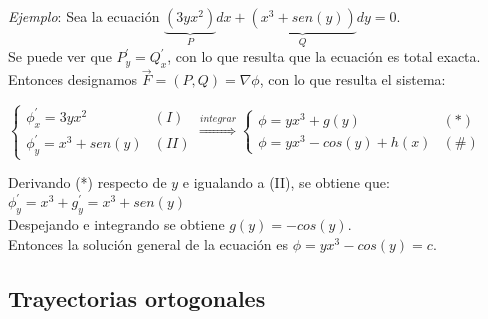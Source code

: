 \documentclass[twoside]{article}
\numberwithin{equation}{section}
\numberwithin{figure}{section}
\numberwithin{table}{section}
\begin{document}
			\vspace{1.5cm}
			
				\emph{Ejemplo}: Sea la ecuación $\underbrace{(3yx^2)}_{P}dx+\underbrace{(x^3+sen(y))}_{Q}dy=0$.\\
				
				Se puede ver que $P^\prime_{y}=Q^\prime_{x}$, con lo que resulta que la ecuación es total exacta.\\
				
				Entonces designamos $\vec{F}=(P,Q)=\nabla\phi$, con lo que resulta el sistema:
								
				\begin{center}
					$\begin{cases}
					\phi^\prime_{x}=3yx^2 & (I)\\
					\phi^\prime_{y}=x^3+sen(y) & (II)\end{cases}\overset{integrar}{\Rightarrow}\begin{cases}
					\phi=yx^3+g(y) & (*)\\
					\phi=yx^3-cos(y)+h(x) & (\#)\end{cases}$
				\end{center}
				
			Derivando ({*}) respecto de $y$ e igualando a (II), se obtiene que:$\phi^\prime_{y}=x^3+g^\prime_{y}=x^3+sen(y)$\\
			
			 Despejando e integrando se obtiene $g(y)=-cos(y)$.\\
			 
			 Entonces la solución general de la ecuación es $\phi=yx^3-cos(y)=c$.
		
		\subsection{Trayectorias ortogonales}
			
\end{document}
